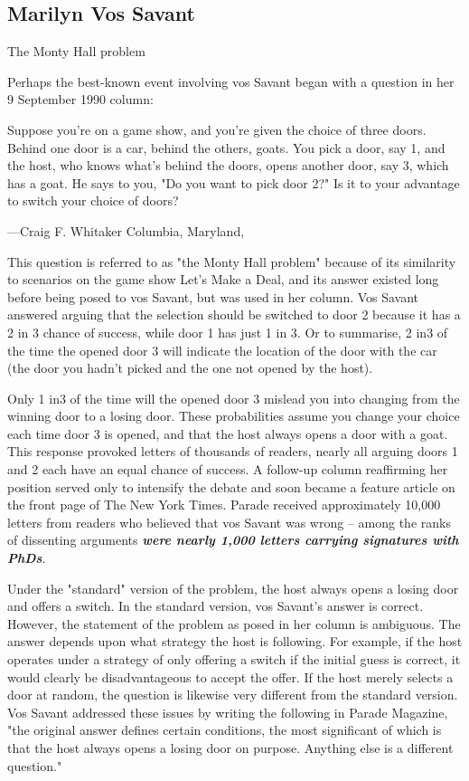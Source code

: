 \documentclass[11pt]{article} %
\begin{document}
\subsection{Marilyn Vos Savant}
The Monty Hall problem 

Perhaps the best-known event involving vos Savant began with a question in her 9 September 1990 column:


Suppose you're on a game show, and you're given the choice of three doors. Behind one door is a car, behind the others, goats. You pick a door, say 1, and the host, who knows what's behind the doors, opens another door, say 3, which has a goat. He says to you, "Do you want to pick door 2?" Is it to your advantage to switch your choice of doors?

—Craig F. Whitaker Columbia, Maryland, 

This question is referred to as "the Monty Hall problem" because of its similarity to scenarios on the game show Let's Make a Deal, and its answer existed long before being posed to vos Savant, but was used in her column. Vos Savant answered arguing that the selection should be switched to door 2 because it has a 2 in 3 chance of success, while door 1 has just 1 in 3. Or to summarise, 2 in3 of the time the opened door 3 will indicate the location of the door with the car (the door you hadn't picked and the one not opened by the host). 

Only 1 in3 of the time will the opened door 3 mislead you into changing from the winning door to a losing door. These probabilities assume you change your choice each time door 3 is opened, and that the host always opens a door with a goat. This response provoked letters of thousands of readers, nearly all arguing doors 1 and 2 each have an equal chance of success. A follow-up column reaffirming her position served only to intensify the debate and soon became a feature article on the front page of The New York Times. Parade received approximately 10,000 letters from readers who believed that vos Savant was wrong – among the ranks of dissenting arguments \textbf{\textit{were nearly 1,000 letters carrying signatures with PhDs}}.

Under the "standard" version of the problem, the host always opens a losing door and offers a switch. In the standard version, vos Savant's answer is correct. However, the statement of the problem as posed in her column is ambiguous. The answer depends upon what strategy the host is following. For example, if the host operates under a strategy of only offering a switch if the initial guess is correct, it would clearly be disadvantageous to accept the offer. If the host merely selects a door at random, the question is likewise very different from the standard version. Vos Savant addressed these issues by writing the following in Parade Magazine, "the original answer defines certain conditions, the most significant of which is that the host always opens a losing door on purpose. Anything else is a different question."
\end{document}

